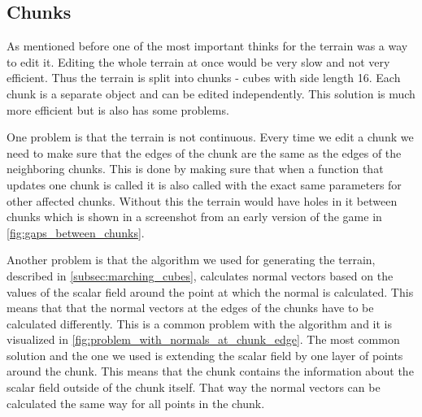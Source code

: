 \subsection*{Chunks}
As mentioned before one of the most important thinks for the terrain was a way to edit it.
Editing the whole terrain at once would be very slow and not very efficient.
Thus the terrain is split into chunks - cubes with side length 16.
Each chunk is a separate object and can be edited independently.
This solution is much more efficient but is also has some problems.

One problem is that the terrain is not continuous.
Every time we edit a chunk we need to make sure that the edges of the chunk are the same as the edges of the neighboring chunks.
This is done by making sure that when a function that updates one chunk is called it is also called with the exact same parameters for other affected chunks.
Without this the terrain would have holes in it between chunks which is shown in a screenshot from an early version of the game in \autoref*{fig:gaps_between_chunks}.

Another problem is that the algorithm we used for generating the terrain, described in \autoref*{subsec:marching_cubes}, calculates normal vectors based on the values of the scalar field around the point at which the normal is calculated.
This means that that the normal vectors at the edges of the chunks have to be calculated differently.
This is a common problem with the algorithm and it is visualized in \autoref*{fig:problem_with_normals_at_chunk_edge}.
The most common solution and the one we used is extending the scalar field by one layer of points around the chunk.
This means that the chunk contains the information about the scalar field outside of the chunk itself.
That way the normal vectors can be calculated the same way for all points in the chunk.


